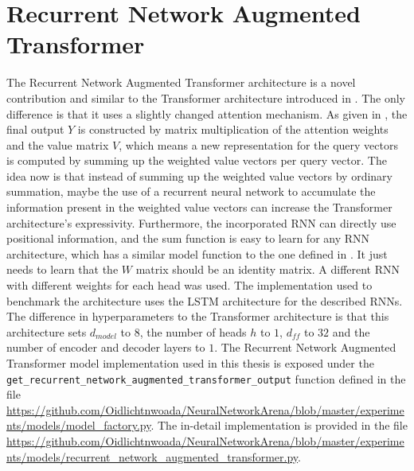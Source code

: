 \documentclass[draft,final]{vutinfth} %
\begin{document}
    \section{Recurrent Network Augmented Transformer} \label{rnaut}
    The Recurrent Network Augmented Transformer architecture is a novel contribution and similar to the Transformer architecture introduced in .
    The only difference is that it uses a slightly changed attention mechanism.
    As given in , the final output $Y$ is constructed by matrix multiplication of the attention weights and the value matrix $V$, which means a new representation for the query vectors is computed by summing up the weighted value vectors per query vector.
    The idea now is that instead of summing up the weighted value vectors by ordinary summation, maybe the use of a recurrent neural network to accumulate the information present in the weighted value vectors can increase the Transformer architecture's expressivity.
    Furthermore, the incorporated RNN can directly use positional information, and the sum function is easy to learn for any RNN architecture, which has a similar model function to the one defined in .
    It just needs to learn that the $W$ matrix should be an identity matrix.
    A different RNN with different weights for each head was used.
    The implementation used to benchmark the architecture uses the LSTM architecture for the described RNNs.
    The difference in hyperparameters to the Transformer architecture is that this architecture sets $d_{model}$ to $8$, the number of heads $h$ to $1$, $d_{ff}$ to $32$ and the number of encoder and decoder layers to $1$.
    The Recurrent Network Augmented Transformer model implementation used in this thesis is exposed under the \texttt{get\_recurrent\_network\_augmented\_transformer\_output} function defined in the file \url{https://github.com/Oidlichtnwoada/NeuralNetworkArena/blob/master/experiments/models/model_factory.py}.
    The in-detail implementation is provided in the file \url{https://github.com/Oidlichtnwoada/NeuralNetworkArena/blob/master/experiments/models/recurrent_network_augmented_transformer.py}.
\end{document}
